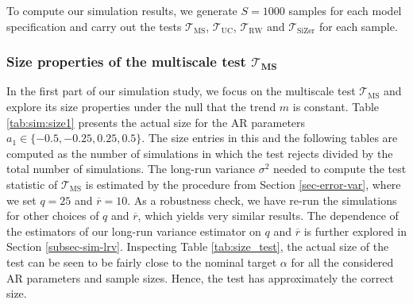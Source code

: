 To compute our simulation results, we generate $S=1000$ samples for each model specification and carry out the tests $\mathcal{T}_{\text{MS}}$, $\mathcal{T}_{\text{UC}}$, $\mathcal{T}_{\text{RW}}$ and $\mathcal{T}_{\text{SiZer}}$ for each sample. 



\subsubsection{Size properties of the multiscale test $\boldsymbol{\mathcal{T}_{\text{MS}}}$}


In the first part of our simulation study, we focus on the multiscale test $\mathcal{T}_{\text{MS}}$ and explore its size properties under the null that the trend $m$ is constant. Table \ref{tab:sim:size1} presents the actual size for the AR parameters $a_1 \in \{-0.5,-0.25,0.25,0.5\}$. The size entries in this and the following tables are computed as the number of simulations in which the test rejects divided by the total number of simulations. The long-run variance $\sigma^2$ needed to compute the test statistic of $\mathcal{T}_{\text{MS}}$ is estimated by the procedure from Section \ref{sec-error-var}, where we set $q = 25$ and $\overline{r} = 10$. As a robustness check, we have re-run the simulations for other choices of $q$ and $\overline{r}$, which yields very similar results. The dependence of the estimators of our long-run variance estimator on $q$ and $\overline{r}$ is further explored in Section \ref{subsec-sim-lrv}. Inspecting Table \ref{tab:size_test}, the actual size of the test can be seen to be fairly close to the nominal target $\alpha$ for all the considered AR parameters and sample sizes. Hence, the test has approximately the correct size.


